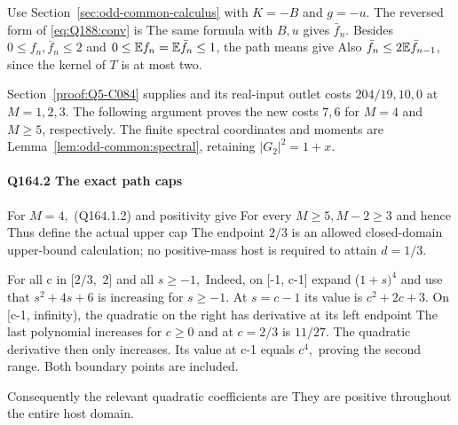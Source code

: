 Use Section~\ref{sec:odd-common-calculus} with \(K=-B\) and \(g=-u\).
The reversed form of \eqref{eq:Q188:conv} is
The same formula with \(B,u\) gives \(\bar f_n\).
Besides \(0\le f_n,\bar f_n\le2\) and
\(0\le\mathbb E f_n=\mathbb E\bar f_n\le1\), the path means give
Also \(\bar f_n\le2\mathbb E\bar f_{n-1}\), since the kernel of \(T\) is at most two.

Section~\ref{proof:Q5-C084} supplies
and its real-input outlet costs \(204/19,10,0\) at \(M=1,2,3\).
The following argument proves the new costs \(7,6\) for \(M=4\)
and \(M\ge5\), respectively.
The finite spectral coordinates and moments are
Lemma~\ref{lem:odd-common:spectral}, retaining \(|G_2|^2=1+x\).

\paragraph{Q164.2 The exact path caps}\label{part:Q164.2}

For \(M=4,\allowbreak \) (Q164.1.2) and positivity give
For every \(M\ge 5,\allowbreak  M-2\ge 3\) and hence
Thus define the actual upper cap
The endpoint \(2/3\) is an allowed closed-domain upper-bound calculation;
no positive-mass host is required to attain \(d=1/3.\)

For all c in [\(2/3,\allowbreak \) 2] and all \(s\ge -1,\allowbreak \)
Indeed, on [-1, c-1] expand (\(1+s)^4\) and use that
\(s^2+4s+6\) is increasing for \(s\ge -1.\) At \(s=c-1\) its value is
\(c^2+2c+3.\) On [c-1, infinity), the quadratic on the right
has derivative at its left endpoint
The last polynomial increases for \(c\ge 0\) and at \(c=2/3\) is \(11/27.\)
The quadratic derivative then only increases. Its value at c-1
equals \(c^4,\allowbreak \) proving the second range. Both boundary points are included.

Consequently the relevant quadratic coefficients are
They are positive throughout the entire host domain.

